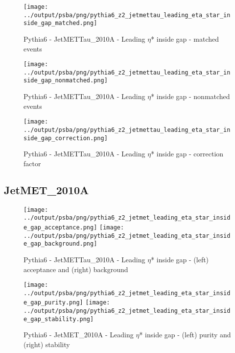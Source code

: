 \documentclass[11pt]{book}
\begin{document}
\begin{figure}[ht]
\centering
\texttt{[image: ../output/psba/png/pythia6\_z2\_jetmettau\_leading\_eta\_star\_inside\_gap\_matched.png]}
\caption{Pythia6 - JetMETTau\_2010A - Leading $\eta$* inside gap - matched events}
\label{fig:p6_jetmettau_leading_eta_star_inside_gap_matched}
\end{figure}

\begin{figure}[ht]
\centering
\texttt{[image: ../output/psba/png/pythia6\_z2\_jetmettau\_leading\_eta\_star\_inside\_gap\_nonmatched.png]}
\caption{Pythia6 - JetMETTau\_2010A - Leading $\eta$* inside gap - nonmatched events}
\label{fig:p6_jetmettau_leading_eta_star_inside_gap_nonmatched}
\end{figure}

\begin{figure}[ht]
\centering
\texttt{[image: ../output/psba/png/pythia6\_z2\_jetmettau\_leading\_eta\_star\_inside\_gap\_correction.png]}
\caption{Pythia6 - JetMETTau\_2010A - Leading $\eta$* inside gap - correction factor}
\label{fig:p6_jetmettau_leading_eta_star_inside_gap_correction}
\end{figure}


\clearpage
\subsection{JetMET\_2010A}

\begin{figure}[ht]
\centering
\texttt{[image: ../output/psba/png/pythia6\_z2\_jetmet\_leading\_eta\_star\_inside\_gap\_acceptance.png]}
\texttt{[image: ../output/psba/png/pythia6\_z2\_jetmet\_leading\_eta\_star\_inside\_gap\_background.png]}
\caption{Pythia6 - JetMETTau\_2010A - Leading $\eta$* inside gap - (left) acceptance and (right) background}
\label{fig:p6_jetmettau_leading_eta_star_inside_gap_ab}
\end{figure}

\begin{figure}[ht]
\centering
\texttt{[image: ../output/psba/png/pythia6\_z2\_jetmet\_leading\_eta\_star\_inside\_gap\_purity.png]}
\texttt{[image: ../output/psba/png/pythia6\_z2\_jetmet\_leading\_eta\_star\_inside\_gap\_stability.png]}
\caption{Pythia6 - JetMET\_2010A - Leading $\eta$* inside gap - (left) purity and (right) stability}
\label{fig:p6_jetmet_leading_eta_star_inside_gap_ps}
\end{figure}
\end{document}
